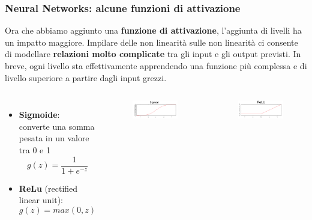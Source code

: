 \begin{frame}

	\frametitle{Neural Networks: alcune funzioni di attivazione}

	Ora che abbiamo aggiunto una \textbf{funzione di attivazione}, l'aggiunta di livelli ha un impatto maggiore. Impilare delle non linearità sulle non linearità ci consente di modellare \textbf{relazioni molto complicate} tra gli input e gli output previsti. In breve, ogni livello sta effettivamente apprendendo una funzione più complessa e di livello superiore a partire dagli input grezzi.

	\begin{columns}
		\begin{itemize}
			\item \textbf{Sigmoide}:\\
				converte una somma pesata in un valore tra 0 e 1
				$$g(z) = \frac{1}{1 + e^{-z}}$$
			\item \textbf{ReLu} (rectified linear unit):
				$$g(z) = max(0, z)$$
		\end{itemize}

		\begin{figure}[!htbp]
			\centering
			\includegraphics[width=1.0\linewidth]{images/supervised/z_algorithms_neural_networks/sigmoid.png}
		\end{figure}
		\begin{figure}[!htbp]
			\centering
			\includegraphics[width=1.0\linewidth]{images/supervised/z_algorithms_neural_networks/relu.png}
		\end{figure}
	\end{columns}


\end{frame}


